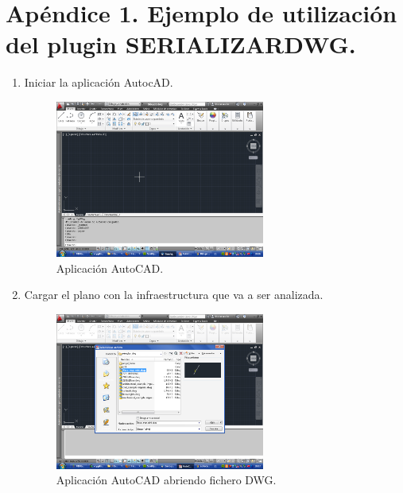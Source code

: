 \section{Apéndice 1. Ejemplo de utilización del plugin SERIALIZARDWG.}

\begin{enumerate}

\item{Iniciar la aplicación AutocAD.}

\begin{figure}[H]
\begin{center}
\includegraphics[width=0.65\textwidth]{imgs/autocad0}
\caption{Aplicación AutoCAD.}
\end{center}
\end{figure}

\item{Cargar el plano con la infraestructura que va a ser analizada.}

\begin{figure}[H]
\begin{center}
\includegraphics[width=0.65\textwidth]{imgs/autocad1}
\caption{Aplicación AutoCAD abriendo fichero DWG.}
\end{center}
\end{figure}


\end{enumerate}
